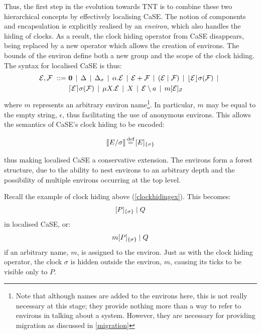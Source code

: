 Thus, the first step in the evolution towards TNT is to combine these
two hierarchical concepts by effectively localising CaSE.  The notion of
components and encapsulation is explicitly realised by an
\emph{environ}, which also handles the hiding of clocks.  As a result,
the clock hiding operator from CaSE disappears, being replaced by a new
operator which allows the creation of environs.  The bounds of the
environ define both a new group and the scope of the clock hiding.  The
syntax for localised CaSE is thus:
\begin{equation}
  \begin{aligned}
    \text{$\mathcal{E}$}, \text{$\mathcal{F}$}\ ::=\ &
    \textbf{0}  \;\,|\,\; 
    \Delta \;\,|\,\; 
    \Delta_{\sigma} \;\,|\,\; 
    \alpha . \text{$\mathcal{E}$}  \;\,|\,\;
    \text{$\mathcal{E}$} + \text{$\mathcal{F}$} \;\,|\,\; 
    (\text{$\mathcal{E}$}\;|\;\text{$\mathcal{F}$})\;\,|\,\; 
    \lfloor{\text{$\mathcal{E}$}}\rfloor {\sigma} ({\text{$\mathcal{F}$}}) \;\,|\,\; \\
    & \lceil{\text{$\mathcal{E}$}}\rceil {\sigma} ({\text{$\mathcal{F}$}}) \;\,|\,\; 
    \mu X . \text{$\mathcal{E}$} \;\,|\,\; 
    X \;\,|\,\; 
    \text{$\mathcal{E}$} \setminus a \;\,|\,\; 
    {m}[ \text{$\mathcal{E}$} ]_{\vec{\sigma}}
  \end{aligned}
\end{equation}
where $m$ represents an arbitrary environ name\footnote{Note
that although names are added to the environs here, this is not really
necessary at this stage; they provide nothing more than a way to refer
to environs in talking about a system.  However, they are necessary
for providing migration as discussed in \ref{migration}}.  In
particular, $m$ may be equal to the empty string, $\epsilon$, thus
facilitating the use of anonymous environs.  This allows the semantics
of CaSE's clock hiding to be encoded:

\begin{equation}
[\hspace{-0.3ex}[ E / \sigma ]\hspace{-0.3ex}] \operatorname{\stackrel{\textrm{def}}{=}} {}[ E ]_{\{\sigma\}}
\end{equation}

\noindent thus making localised CaSE a conservative extension.  The
environs form a forest structure, due to the ability to nest
environs to an arbitrary depth and the possibility of multiple
environs occurring at the top level.

Recall the example of clock hiding above (\ref{clockhidingex}).  This
becomes:
\begin{equation}
  {}[ P ]_{\{\sigma\}}\;|\;Q
\end{equation}
in localised CaSE, or:
\begin{equation}
  {m}[ P ]_{\{\sigma\}}\;|\;Q
\end{equation}
if an arbitrary name, $m$, is assigned to the environ.  Just
as with the clock hiding operator, the clock $\sigma$ is hidden outside
the environ, $m$, causing its ticks to be visible only to $P$.  

